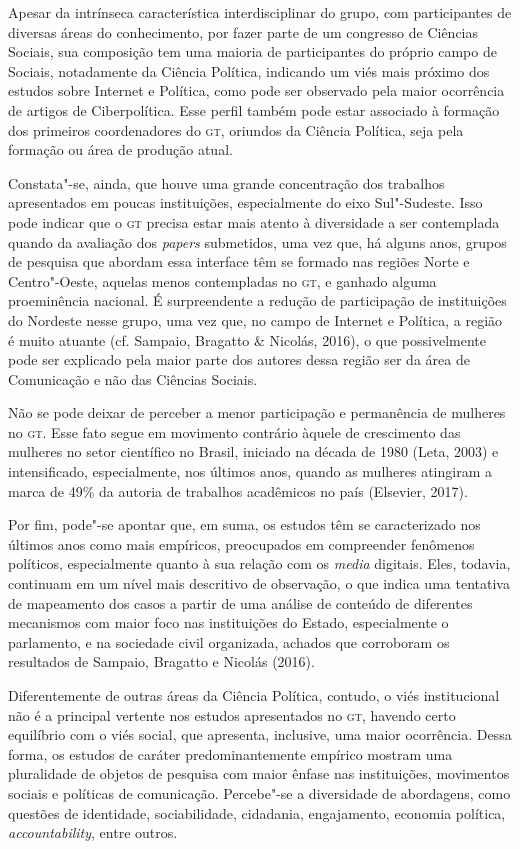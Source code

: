Apesar da intrínseca característica interdisciplinar do grupo, com
participantes de diversas áreas do conhecimento, por fazer parte de um
congresso de Ciências Sociais, sua composição tem uma maioria de
participantes do próprio campo de Sociais, notadamente da Ciência
Política, indicando um viés mais próximo dos estudos sobre Internet e
Política, como pode ser observado pela maior ocorrência de artigos de
Ciberpolítica. Esse perfil também pode estar associado à formação dos
primeiros coordenadores do \textsc{gt}, oriundos da Ciência Política, seja pela
formação ou área de produção atual.

Constata"-se, ainda, que houve uma grande concentração dos trabalhos
apresentados em poucas instituições, especialmente do eixo Sul"-Sudeste.
Isso pode indicar que o \textsc{gt} precisa estar mais atento à diversidade a ser
contemplada quando da avaliação dos \emph{papers} submetidos, uma vez
que, há alguns anos, grupos de pesquisa que abordam essa interface têm
se formado nas regiões Norte e Centro"-Oeste, aquelas menos contempladas
no \textsc{gt}, e ganhado alguma proeminência nacional. É surpreendente a redução
de participação de instituições do Nordeste nesse grupo, uma vez que, no
campo de Internet e Política, a região é muito atuante (cf. Sampaio,
Bragatto \& Nicolás, 2016), o que possivelmente pode ser explicado pela
maior parte dos autores dessa região ser da área de Comunicação e
não das Ciências Sociais.

Não se pode deixar de perceber a menor participação e permanência de
mulheres no \textsc{gt}. Esse fato segue em movimento contrário àquele de
crescimento das mulheres no setor científico no Brasil, iniciado na
década de 1980 (Leta, 2003) e intensificado, especialmente, nos últimos
anos, quando as mulheres atingiram a marca de 49\% da autoria de
trabalhos acadêmicos no país (Elsevier, 2017).

Por fim, pode"-se apontar que, em suma, os estudos têm se caracterizado
nos últimos anos como mais empíricos, preocupados em compreender
fenômenos políticos, especialmente quanto à sua relação com os
\emph{media} digitais. Eles, todavia, continuam em um nível mais
descritivo de observação, o que indica uma tentativa de mapeamento dos
casos a partir de uma análise de conteúdo de diferentes mecanismos com
maior foco nas instituições do Estado, especialmente o parlamento, e na
sociedade civil organizada, achados que corroboram os resultados de
Sampaio, Bragatto e Nicolás (2016).

Diferentemente de outras áreas da Ciência Política, contudo, o viés
institucional não é a principal vertente nos estudos apresentados no \textsc{gt},
havendo certo equilíbrio com o viés social, que apresenta, inclusive,
uma maior ocorrência. Dessa forma, os estudos de caráter
predominantemente empírico mostram uma pluralidade de objetos de
pesquisa com maior ênfase nas instituições, movimentos sociais e
políticas de comunicação. Percebe"-se a diversidade de abordagens, como
questões de identidade, sociabilidade, cidadania, engajamento, economia
política, \emph{accountability}, entre outros.

